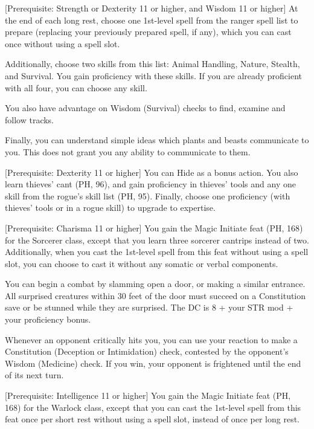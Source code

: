 \documentclass[letterpaper,twocolumn,openany,nodeprecatedcode,bg=print]{dndbook}
\begin{document}
[Prerequisite: Strength or Dexterity 11 or higher, and Wisdom 11 or higher]
\label{ranger-initiate}
At the end of each long rest, choose one 1st-level spell from the ranger spell list to prepare (replacing your previously prepared spell, if any), which you can cast once without using a spell slot. 

Additionally, choose two skills from this list: Animal Handling, Nature, Stealth, and Survival. You gain proficiency with these skills. If you are already proficient with all four, you can choose any skill.

You also have advantage on Wisdom (Survival) checks to find, examine and follow tracks.

Finally, you can understand simple ideas which plants and beasts communicate to you. This does not grant you any ability to communicate to them.

[Prerequisite: Dexterity 11 or higher]
\label{rogue-initiate}
You can Hide as a bonus action. You also learn thieves' cant (PH, 96), and gain proficiency in thieves' tools and any one skill from the rogue's skill list (PH, 95). Finally, choose one proficiency (with thieves' tools or in a rogue skill) to upgrade to expertise.

[Prerequisite: Charisma 11 or higher]
\label{sorcerer-initiate}
You gain the Magic Initiate feat (PH, 168) for the Sorcerer class, except that you learn three sorcerer cantrips instead of two. Additionally, when you cast the 1st-level spell from this feat without using a spell slot, you can choose to cast it without any somatic or verbal components.

\label{stunning-irruption}
You can begin a combat by slamming open a door, or making a similar entrance. All surprised creatures within 30 feet of the door must succeed on a Constitution save or be stunned while they are surprised. The DC is 8 + your STR mod + your proficiency bonus.

\label{tis-but-a-scratch}
Whenever an opponent critically hits you, you can use your reaction to make a Constitution (Deception or Intimidation) check, contested by the opponent's Wisdom (Medicine) check. If you win, your opponent is frightened until the end of its next turn.

[Prerequisite: Intelligence 11 or higher]
\label{warlock-initiate}
You gain the Magic Initiate feat (PH, 168) for the Warlock class, except that you can cast the 1st-level spell from this feat once per short rest without using a spell slot, instead of once per long rest.
\end{document}
